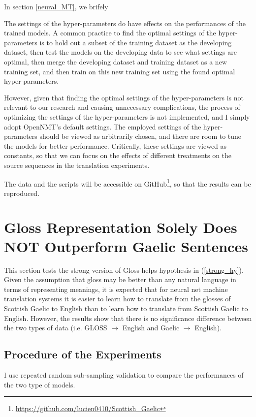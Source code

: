 \documentclass[final]{ua-thesis}
\numberwithin{equation}{section}
\begin{document}
In section \ref{neural_MT}, we brifely  

The settings of the hyper-parameters do have effects on the performances of the trained models.
A common practice to find the optimal settings of the hyper-parameters is to hold out a subset of the training dataset as the developing dataset, then test the models on the developing data to see what settings are optimal, then merge the developing dataset and training dataset as a new training set, and then train on this new training set using the found optimal hyper-parameters.

However, given that finding the optimal settings of the hyper-parameters is not relevant to our research and causing unnecessary complications, the process of optimizing the settings of the hyper-parameters is not implemented, and I simply adopt OpenNMT's default settings. The employed settings of the hyper-parameters should be viewed as arbitrarily chosen, and there are room to tune the models for better performance. Critically, these settings are viewed as constants, so that we can focus on the effects of different treatments on the source sequences in the translation experiments.

The data and the scripts will be accessible on GitHub\footnote{\url{https://github.com/lucien0410/Scottish_Gaelic}}, so that the results can be reproduced.  

\section{Gloss Representation Solely Does NOT Outperform Gaelic Sentences} \label{gd_to_gl_to_en}
This section tests the strong version of Gloss-helps hypothesis in (\ref{strong_hy}).
Given the assumption that gloss may be better than any natural language in terms of representing meanings, it is expected that for neural net machine translation systems it is easier to learn how to translate from the glosses of Scottish Gaelic to English than to learn how to translate from Scottish Gaelic to English. However, the results show that there is no significance difference between the two types of data (i.e. GLOSS $\rightarrow$ English and Gaelic $\rightarrow$ English).

\subsection{Procedure of the Experiments}
I use repeated random sub-sampling validation to compare the performances of the two type of models.
\end{document}
